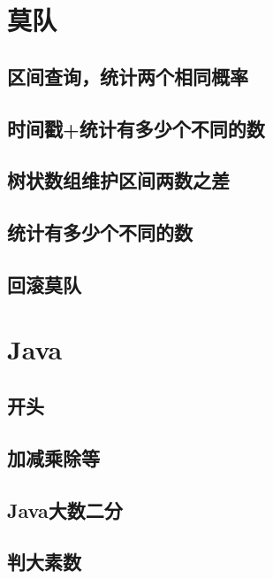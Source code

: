 \documentclass{article}
\begin{document}
\section{莫队}

\subsection{﻿区间查询，统计两个相同概率}

\subsection{时间戳+统计有多少个不同的数}

\subsection{树状数组维护区间两数之差}

\subsection{统计有多少个不同的数}

\subsection{回滚莫队}


\section{Java}
\subsection{﻿开头}

\subsection{加减乘除等}

\subsection{Java大数二分}

\subsection{判大素数}

\end{document}
